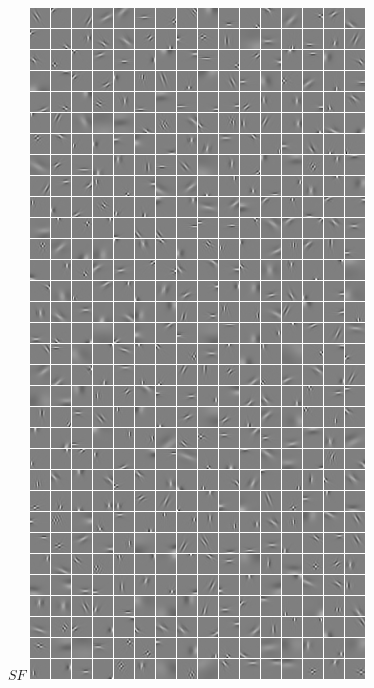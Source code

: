 \documentclass{beamer}
\begin{document}
\begin{frame}
\begin{columns}[c]
\begin{center}
        \end{center}
     \column{3cm} 
     \begin{center} 
     $SF$ 
     \includegraphics[scale=0.3]{./figures/SF.png} 
     \end{center} 
     
\end{columns} 
\end{frame} 
\end{document}
